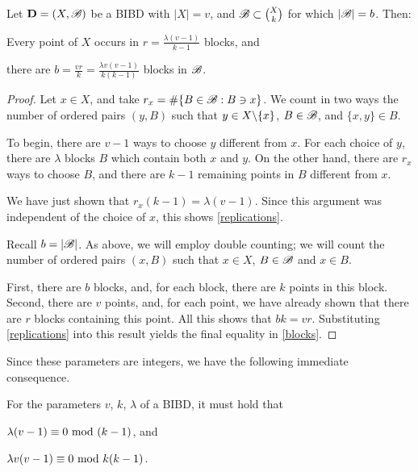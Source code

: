 \documentclass[../../../main]{subfiles}
\begin{document}
\begin{prop}\label{prop-bibd-params}
Let $\mathbf{D}=(X,\mathscr{B})$ be a BIBD with $|X| = v$, and $\mathscr{B} \subset \binom{X}{k}$ for which $|\mathscr{B}| = b$. Then:
\begin{defenum}
\item\label{replications} Every point of $X$ occurs in $r = \frac{\lambda(v-1)}{k-1}$ blocks, and 
\item\label{blocks} there are $b = \frac{vr}{k} = \frac{\lambda v(v-1)}{k(k-1)}$ blocks in $\mathscr{B}$.
\end{defenum}
\end{prop}

\begin{proof}
  Let $x \in X$, and take $r_x = \#\{B \in \mathscr{B} : B \ni x\}$. We count in two ways the number of ordered pairs $(y,B)$ such that $y \in X \backslash \{x\}$, $B \in \mathscr{B}$, and $\{x,y\} \in B$.
  
  To begin, there are $v-1$ ways to choose $y$ different from $x$. For each choice of $y$, there are $\lambda$ blocks $B$ which contain both $x$ and $y$. On the other hand, there are $r_x$ ways to choose $B$, and there are $k-1$ remaining points in $B$ different from $x$.
  
  We have just shown that $r_x(k-1) = \lambda(v-1)$. Since this argument was independent of the choice of $x$, this shows \ref{replications}.
  
  Recall $b = |\mathscr{B}|$. As above, we will employ double counting; we will count the number of ordered pairs $(x,B)$ such that $x \in X$, $B \in \mathscr{B}$ and $x \in B$.
  
  First, there are $b$ blocks, and, for each block, there are $k$ points in this block. Second, there are $v$ points, and, for each point, we have already shown that there are $r$ blocks containing this point. All this shows that $bk = vr$. Substituting \ref{replications} into this result yields the final equality in \ref{blocks}.
\end{proof}

Since these parameters are integers, we have the following immediate consequence.

\begin{cor}\label{cor-bibd-params}
 For the parameters $v$, $k$, $\lambda$ of a BIBD, it must hold that 
 \begin{defenum}
 \item $\lambda(v-1) \equiv 0 \text{ mod } (k-1)$, and
 \item $\lambda v(v-1) \equiv 0 \text{ mod } k(k-1)$.
 \end{defenum}
\end{cor}
\end{document}
